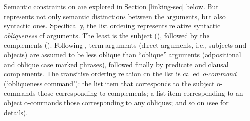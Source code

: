 \documentclass[output=paper
                ,modfonts
                ,nonflat
	        ,collection
	        ,collectionchapter
	        ,collectiontoclongg
 	        ,biblatex
                ,babelshorthands
                ,newtxmath
                ,draftmode
                ,colorlinks, citecolor=brown
]{./langsci/langscibook}
\begin{document}
Semantic constraints on \argst are explored in Section \ref{linking-sec} below.  But \argst represents not only
semantic distinctions between the arguments, but also  %
syntactic  ones.  Specifically, the list ordering represents relative syntactic \textit{obliqueness} of arguments.   The least  is the subject (\subj), followed by the complements (\comps).  Following \citet{Manning1996}, term arguments (direct arguments, i.e., subjects and objects) are  assumed to be less oblique than ``oblique'' arguments (adpositional and oblique case marked phrases), followed finally by predicate and clausal complements.  The transitive ordering relation on the \argst list is called \textit{o-command} (`obliqueness command'):  the list item that corresponds to the subject o-commands those corresponding to complements; a list item corresponding to an object o-commands  those corresponding to any obliques; and so on (see  for details).
 


\end{document}
